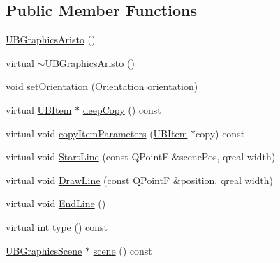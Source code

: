 \subsection*{Public Member Functions}
\begin{DoxyCompactItemize}
\item 
\hyperlink{class_u_b_graphics_aristo_a4577f1147d21cadecf59d9637dacfb6b}{U\-B\-Graphics\-Aristo} ()
\item 
virtual \hyperlink{class_u_b_graphics_aristo_a3fb63d1294b21cf035d56b78f01ccbc0}{$\sim$\-U\-B\-Graphics\-Aristo} ()
\item 
void \hyperlink{class_u_b_graphics_aristo_a3d30683ac4014ed9ea722d597cb65182}{set\-Orientation} (\hyperlink{class_u_b_graphics_aristo_a346151deb4ebe2925a8c232e85a60fd6}{Orientation} orientation)
\item 
virtual \hyperlink{class_u_b_item}{U\-B\-Item} $\ast$ \hyperlink{class_u_b_graphics_aristo_a9139b4fed7604be23bd8cb429b12d54a}{deep\-Copy} () const 
\item 
virtual void \hyperlink{class_u_b_graphics_aristo_af67823d02c787d0f52b8955454a2bfa8}{copy\-Item\-Parameters} (\hyperlink{class_u_b_item}{U\-B\-Item} $\ast$copy) const 
\item 
virtual void \hyperlink{class_u_b_graphics_aristo_a6c1672fb375f65509b15f964ea5b709e}{Start\-Line} (const Q\-Point\-F \&scene\-Pos, qreal width)
\item 
virtual void \hyperlink{class_u_b_graphics_aristo_a005f6581c02f86e19b1117d2ab9505d8}{Draw\-Line} (const Q\-Point\-F \&position, qreal width)
\item 
virtual void \hyperlink{class_u_b_graphics_aristo_ab747dfce4445d9a9b060d38d71729527}{End\-Line} ()
\item 
virtual int \hyperlink{class_u_b_graphics_aristo_ac25a5d3cbee3a1387f4c4f6c3e20175a}{type} () const 
\item 
\hyperlink{class_u_b_graphics_scene}{U\-B\-Graphics\-Scene} $\ast$ \hyperlink{class_u_b_graphics_aristo_ae53a96ef8f69832958f5bd8ee1af7def}{scene} () const 
\end{DoxyCompactItemize}
